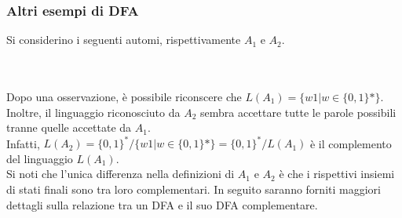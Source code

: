 \documentclass[]{article}
\begin{document}
\subsubsection{Altri esempi di DFA}

Si considerino i seguenti automi, rispettivamente \mbox{$A_1$} e \mbox{$A_2$}.
\\
\\
\\
Dopo una osservazione, è possibile riconscere che \mbox{$ L(A_1) = \{ w1 | w \in \{ 0, 1 \}* \} $}.
Inoltre, il linguaggio riconosciuto da \mbox{$A_2$} sembra accettare tutte le parole possibili tranne
quelle accettate da \mbox{$A_1$}.
\\
Infatti, \mbox{$ L(A_2) = \{ 0, 1 \}^* / \{ w1 | w \in \{ 0, 1 \}* \} = \{ 0, 1 \}^* / L(A_1) $} è il
complemento del linguaggio \mbox{$L(A_1)$}.
\\
Si noti che l'unica differenza nella definizioni di \mbox{$A_1$} e \mbox{$A_2$} è che i rispettivi
insiemi di stati finali sono tra loro complementari. In seguito saranno forniti maggiori dettagli sulla
relazione tra un DFA e il suo DFA complementare.
\end{document}
